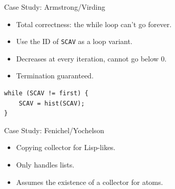 \documentclass[usenames,dvipsnames]{beamer}
\begin{document}
\begin{frame}[fragile]{Case Study: Armstrong/Virding}
  \begin{itemize}
  \item Total correctness: the while loop can't go forever.
  \item Use the ID of \texttt{SCAV} as a loop variant.
  \item Decreases at every iteration, cannot go below 0.
  \item Termination guaranteed.
  \end{itemize}

  \begin{lstlisting}
while (SCAV != first) {
    SCAV = hist(SCAV);
}
  \end{lstlisting}

\end{frame}

\begin{frame}[fragile]{Case Study: Fenichel/Yochelson}
  \begin{itemize}
  \item Copying collector for Lisp-likes.
  \item Only handles lists.
  \item Assumes the existence of a collector for atoms.
  \end{itemize}

\end{frame}
\end{document}
